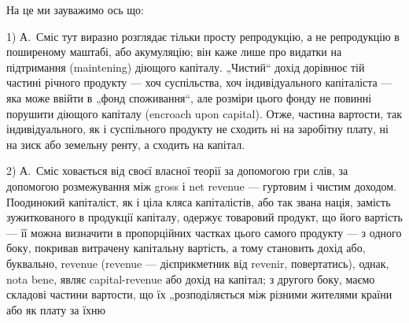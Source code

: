 На це ми зауважимо ось що:

1) А.~Сміс тут виразно розглядає тільки просту репродукцію, а не
репродукцію в поширеному маштабі, або акумуляцію; він каже лише про
видатки на підтримання (maintening) діющого капіталу. „Чистий“ дохід
дорівнює тій частині річного продукту — хоч суспільства, хоч індивідуального
капіталіста — яка може ввійти в „фонд споживання“, але розміри
цього фонду не повинні порушити діющого капіталу (encroach upon capital).
Отже, частина вартости, так індивідуального, як і суспільного продукту
не сходить ні на заробітну плату, ні на зиск або земельну ренту,
а сходить на капітал.

2) А.~Сміс ховається від своєї власної теорії за допомогою гри слів,
за допомогою розмежування між gross і net revenue — гуртовим і чистим
доходом. Поодинокий капіталіст, як і ціла кляса капіталістів, або так
звана нація, замість зужиткованого в продукції капіталу, одержує товаровий
продукт, що його вартість — її можна визначити в пропорційних частках
цього самого продукту — з одного боку, покривав витрачену капітальну
вартість, а тому становить дохід або, буквально, revenue (revenue — дієприкметник
від revenir, повертатись), однак, nota bene, являє capital-revenue або
дохід на капітал; з другого боку, маємо складові частини вартости, що
їх „розподіляється між різними жителями країни або як плату за їхню
\parbreak{}  %
